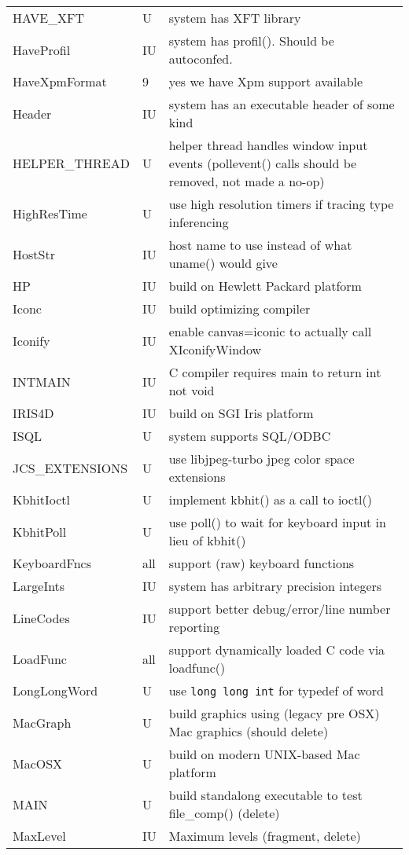 \begin{xtabular}{|m{1.8in}|m{0.5in}|m{4.0in}|}
HAVE\_XFT & U & system has XFT library \\
HaveProfil & IU & system has profil(). Should be autoconfed. \\
HaveXpmFormat & 9 & yes we have Xpm support available \\
Header & IU & system has an executable header of some kind \\
HELPER\_THREAD & U & helper thread handles window input events
	(pollevent() calls should be removed, not made a no-op) \\
HighResTime & U & use high resolution timers if tracing type inferencing \\
HostStr & IU & host name to use instead of what uname() would give \\
HP & IU & build on Hewlett Packard platform \\
Iconc & IU & build optimizing compiler \\
Iconify & IU & enable canvas=iconic to actually call XIconifyWindow \\
INTMAIN & IU & C compiler requires main to return int not void \\
IRIS4D & IU & build on SGI Iris platform \\
ISQL & U & system supports SQL/ODBC \\
JCS\_EXTENSIONS & U & use libjpeg-turbo jpeg color space extensions \\
KbhitIoctl & U & implement kbhit() as a call to ioctl() \\
KbhitPoll & U & use poll() to wait for keyboard input in lieu of kbhit() \\
KeyboardFncs & all & support (raw) keyboard functions \\
LargeInts & IU & system has arbitrary precision integers \\
LineCodes & IU & support better debug/error/line number reporting \\
LoadFunc & all & support dynamically loaded C code via loadfunc() \\
LongLongWord & U & use \texttt{long long int} for typedef of word \\
MacGraph & U & build graphics using (legacy pre OSX) Mac graphics (should delete)  \\
MacOSX & U & build on modern UNIX-based Mac platform \\
MAIN & U & build standalong executable to test file\_comp() (delete) \\
MaxLevel & IU & Maximum levels (fragment, delete) \\

\end{xtabular}
